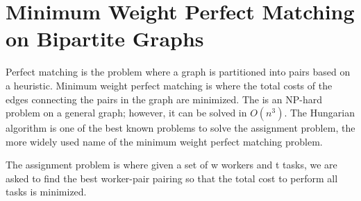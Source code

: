 \documentclass[12pt]{dalthesis}
\newcommand*{\kmeans}{\textsc{K-Means} } %
\newcommand*{\kmeansn}{\textsc{K-Means}} %
\begin{document}
    







\section{Minimum Weight Perfect Matching on Bipartite Graphs}
Perfect matching is the problem where a graph is partitioned into pairs based on a heuristic. Minimum weight perfect matching is where the total costs of the edges connecting the pairs in the graph are minimized. The is an NP-hard problem on a general graph; however, it can be solved in $O(n^3)$. The Hungarian algorithm is one of the best known problems to solve the assignment problem, the more widely used name of the minimum weight perfect matching problem.

The assignment problem is where given a set of w workers and t tasks, we are asked to find the best worker-pair pairing so that the total cost to perform all tasks is minimized.
\end{document}
